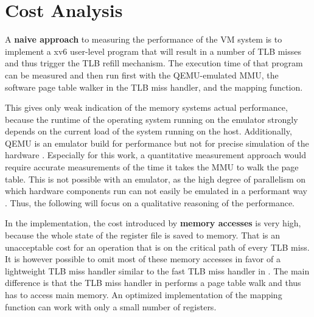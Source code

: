 


\section{Cost Analysis}

A \textbf{naive approach} to measuring the performance of the VM system is to implement a xv6 user-level program that will result in a number of TLB misses and thus trigger the TLB refill mechanism. The execution time of that program can be measured and then run first with the QEMU-emulated MMU, the software page table walker in the TLB miss handler, and the mapping function.

This gives only weak indication of the memory systems actual performance, because the runtime of the operating system running on the emulator strongly depends on the current load of the system running on the host. Additionally, QEMU is an emulator build for performance but not for precise simulation of the hardware \cite{bellard2005qemu}. Especially for this work, a quantitative measurement approach would require accurate measurements of the time it takes the MMU to walk the page table. This is not possible with an emulator, as the high degree of parallelism on which hardware components run can not easily be emulated in a performant way \cite{chen2010emulator}. Thus, the following will focus on a qualitative reasoning of the performance.

In the implementation, the cost introduced by \textbf{memory accesses} is very high, because the whole state of the register file is saved to memory. That is an unacceptable cost for an operation that is on the critical path of every TLB miss. It is however possible to omit most of these memory accesses in favor of a lightweight TLB miss handler similar to the fast TLB miss handler in \cite{heiserAnatomyHighPerformanceMicrokernel}. The main difference is that the TLB miss handler in \cite{heiserAnatomyHighPerformanceMicrokernel} performs a page table walk and thus has to access main memory. An optimized implementation of the mapping function can work with only a small number of registers.


